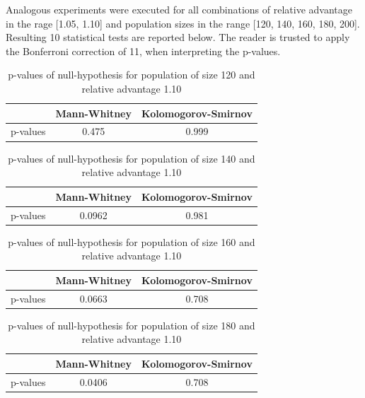 \documentclass{l4proj}
\begin{document}
Analogous experiments were executed for all combinations of relative advantage in the rage [1.05, 1.10] and population sizes in the range [120, 140, 160, 180, 200]. Resulting 10 statistical tests are reported below. The reader is trusted to apply the Bonferroni correction of 11, when interpreting the p-values.

\begin{table}[]
    \centering
    \begin{tabular}{|c|c|c|}
    \hline
    & Mann-Whitney & Kolomogorov-Smirnov \\ \hline
    p-values & 0.475 & 0.999 \\ \hline
    \end{tabular}
    \caption{p-values of null-hypothesis for population of size 120 and relative advantage 1.10}
\end{table}

\begin{table}[]
    \centering
    \begin{tabular}{|c|c|c|}
    \hline
    & Mann-Whitney & Kolomogorov-Smirnov \\ \hline
    p-values & 0.0962 & 0.981 \\ \hline
    \end{tabular}
    \caption{p-values of null-hypothesis for population of size 140 and relative advantage 1.10}
\end{table}

\begin{table}[]
    \centering
    \begin{tabular}{|c|c|c|}
    \hline
    & Mann-Whitney & Kolomogorov-Smirnov \\ \hline
    p-values & 0.0663 & 0.708 \\ \hline
    \end{tabular}
    \caption{p-values of null-hypothesis for population of size 160 and relative advantage 1.10}
\end{table}

\begin{table}[]
    \centering
    \begin{tabular}{|c|c|c|}
    \hline
    & Mann-Whitney & Kolomogorov-Smirnov \\ \hline
    p-values & 0.0406 & 0.708 \\ \hline
    \end{tabular}
    \caption{p-values of null-hypothesis for population of size 180 and relative advantage 1.10}
\end{table}
\end{document}
